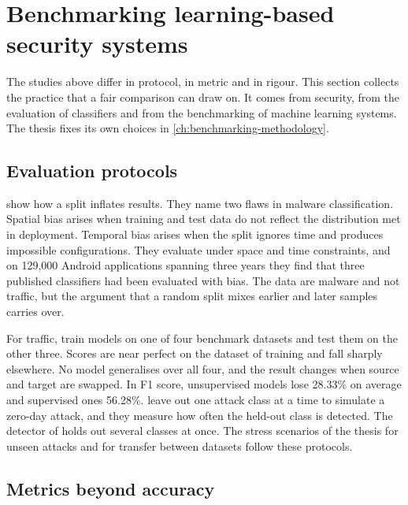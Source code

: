 \section{Benchmarking learning-based security systems}
\label{sec:benchmarking-practice}

The studies above differ in protocol, in metric and in rigour. This section
collects the practice that a fair comparison can draw on. It comes from
security, from the evaluation of classifiers and from the benchmarking of
machine learning systems. The thesis fixes its own choices in
\cref{ch:benchmarking-methodology}.

\subsection{Evaluation protocols}
\label{sec:evaluation-protocols}

\citet{pendlebury2019tesseract} show how a split inflates results. They name
two flaws in malware classification. Spatial bias arises when training and test
data do not reflect the distribution met in deployment. Temporal bias arises
when the split ignores time and produces impossible configurations. They
evaluate under space and time constraints, and on 129{,}000 Android
applications spanning three years they find that three published classifiers had
been evaluated with bias. The data are malware and not traffic, but the
argument that a random split mixes earlier and later samples carries over.

For traffic, \citet{layeghy2022generalisability} train models on one of four
benchmark datasets and test them on the other three. Scores are near perfect on
the dataset of training and fall sharply elsewhere. No model generalises over
all four, and the result changes when source and target are swapped.
In F1 score, unsupervised models lose 28.33\% on average and supervised ones
56.28\%.
\citet{sarhan2021zeroshot} leave out one attack class at a time to simulate a
zero-day attack, and they measure how often the held-out class is detected.
The detector of \citet{bizzarri2024nsaids} holds out several classes at once. The
stress scenarios of the thesis for unseen attacks and for transfer between
datasets follow these protocols.

\subsection{Metrics beyond accuracy}
\label{sec:metrics-beyond-accuracy}

